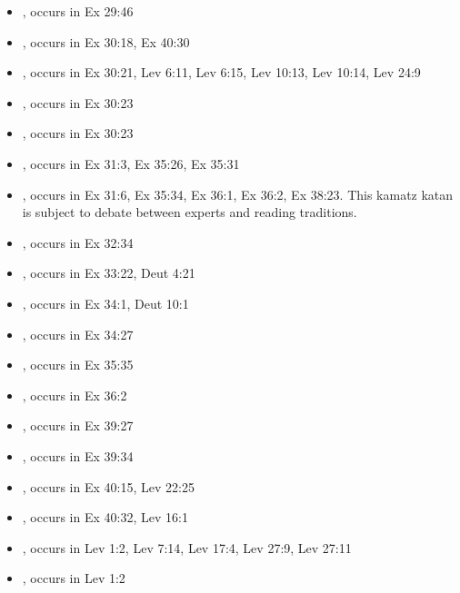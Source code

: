\documentclass[14pt]{article}
\begin{document}
\begin{itemize}
\item {}, occurs in Ex 29:46

\item {}, occurs in Ex 30:18, Ex 40:30

\item {}, occurs in Ex 30:21, Lev 6:11, Lev 6:15, Lev 10:13, Lev 10:14, Lev 24:9

\item {}, occurs in Ex 30:23

\item {}, occurs in Ex 30:23

\item {}, occurs in Ex 31:3, Ex 35:26, Ex 35:31

\item {}, occurs in Ex 31:6, Ex 35:34, Ex 36:1, Ex 36:2, Ex 38:23. This kamatz katan is subject to debate between experts and reading traditions.

\item {}, occurs in Ex 32:34

\item {}, occurs in Ex 33:22, Deut 4:21

\item {}, occurs in Ex 34:1, Deut 10:1

\item {}, occurs in Ex 34:27

\item {}, occurs in Ex 35:35

\item {}, occurs in Ex 36:2

\item {}, occurs in Ex 39:27

\item {}, occurs in Ex 39:34

\item {}, occurs in Ex 40:15, Lev 22:25

\item {}, occurs in Ex 40:32, Lev 16:1

\item {}, occurs in Lev 1:2, Lev 7:14, Lev 17:4, Lev 27:9, Lev 27:11

\item {}, occurs in Lev 1:2


\end{itemize}
\end{document}
